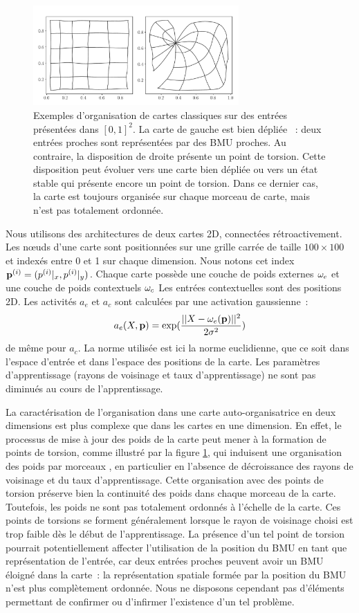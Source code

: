 \documentclass[../main]{subfiles}
\begin{document}
\begin{figure}
	\centering\includegraphics[width=0.7\textwidth]{grid_torsion.pdf}
	\caption{Exemples d'organisation de cartes classiques sur des entrées présentées dans $[0,1]^2$. 
	La carte de gauche est \og bien dépliée \fg{}~: deux entrées proches sont représentées par des BMU proches. 
	Au contraire, la disposition de droite présente un point de torsion. Cette disposition peut évoluer vers une carte bien dépliée ou vers un état stable qui présente encore un point de torsion. Dans ce dernier cas, la carte est toujours organisée sur chaque morceau de carte, mais n'est pas totalement ordonnée. \label{fig:torsion}
	}
\end{figure}

Nous utilisons des architectures de deux cartes 2D, connectées rétroactivement.
Les n\oe{}uds d'une carte sont positionnées sur une grille carrée de taille $100 \times 100$ et indexés entre 0 et 1 sur chaque dimension. Nous notons cet index $\mathbf{p}^{({i})} = (p^{({i})}|_x, p^{({i})}|_y)$.
Chaque carte possède une couche de poids externes $\omega_{e}$ et une couche de poids contextuels $\omega_c$
Les entrées contextuelles sont des positions 2D.
Les activités $a_e$ et $a_c$ sont calculées par une activation gaussienne~:
$$a_e(X,\mathbf{p}) = \exp(\frac{||X - \omega_e(\mathbf{p}) ||^2}{2\sigma^2})$$
de même pour $a_c$.
La norme utilisée est ici la norme euclidienne, que ce soit dans l'espace d'entrée et dans l'espace des positions de la carte. Les paramètres d'apprentissage (rayons de voisinage et taux d'apprentissage) ne sont pas diminués au cours de l'apprentissage.

La caractérisation de l'organisation dans une carte auto-organisatrice en deux dimensions est plus complexe que dans les cartes en une dimension. En effet, le processus de mise à jour des poids de la carte peut mener à la formation de points de torsion, comme illustré par la figure \ref{fig:torsion}, qui induisent une organisation des poids \og par morceaux \fg{}, en particulier en l'absence de décroissance des rayons de voisinage et du taux d'apprentissage.
Cette organisation avec des points de torsion préserve bien la continuité des poids dans chaque morceau de la carte. Toutefois, les poids ne sont pas totalement ordonnés à l'échelle de la carte. Ces points de torsions se forment généralement lorsque le rayon de voisinage choisi est trop faible dès le début de l'apprentissage.
La présence d'un tel point de torsion pourrait potentiellement affecter l'utilisation de la position du BMU en tant que représentation de l'entrée, car deux entrées proches peuvent avoir un BMU éloigné dans la carte~: la représentation spatiale formée par la position du BMU n'est plus complètement ordonnée. Nous ne disposons cependant pas d'éléments permettant de confirmer ou d'infirmer l'existence d'un tel problème.
\end{document}
